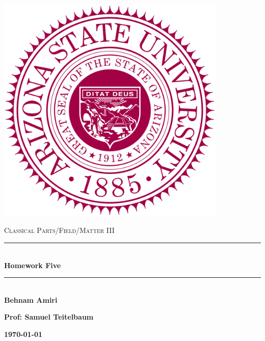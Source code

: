 \documentclass[fleqn]{article}
\begin{document}
  \begin{titlepage}

    \newcommand{\HRule}{\rule{\linewidth}{0.5mm}}

    \center

    \begin{center}
      \includegraphics[height=11cm, width=11cm]{asu.png}
    \end{center}

    \vline

    \textsc{\LARGE Classical Parts/Field/Matter III}\\[1.5cm]

    \HRule \\[0.5cm]
    { \huge \bfseries Homework Five}\\[0.4cm] 
    \HRule \\[1.0cm]

    \textbf{Behnam Amiri}

    \bigbreak

    \textbf{Prof: Samuel Teitelbaum}

    \bigbreak

    \textbf{{\large \today}\\[2cm]}

    \vfill

  \end{titlepage}
\end{document}
